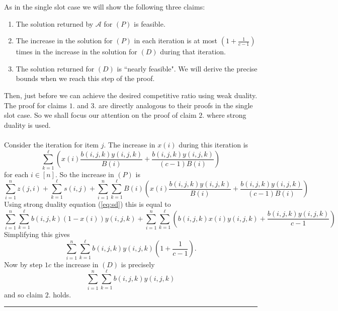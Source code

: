 \documentclass[letterpaper,12pt,oneside,onecolumn]{article}
\newcommand{\cA}{\mathcal{A}} \newcommand{\cB}{\mathcal{B}}
\newenvironment{proof}{{\bf Proof:  }}{\hfill\rule{2mm}{2mm}}
\begin{document}
\begin{proof}
As in the single slot case we will show the following three claims:
\begin{enumerate}
\item The solution returned by $\cA$ for $(P)$ is feasible.
\item The increase in the solution for $(P)$ in each iteration is at most $(1+\frac{1}{c-1})$ times in the increase in the solution for $(D)$ during that iteration.
\item The solution returned for $(D)$ is ``nearly feasible". We will derive the precise bounds when we reach this step of the proof. 
\end{enumerate}
Then, just before we can achieve the desired competitive ratio using weak duality.  The proof for claims $1.$ and $3.$ are directly analogous to their proofs in the single slot case. So we shall focus our attention on the proof of claim $2.$ where strong duality is used.
\paragraph{}
Consider the iteration for item $j$. The increase in $x(i)$ during this iteration is 
$$ \sum_{k=1}^\ell (x(i)\frac{b(i,j,k)y(i,j,k)}{B(i)} + \frac{b(i,j,k)y(i,j,k)}{(c-1)B(i)})$$
for each $i \in [n]$. So the increase in $(P)$ is
$$\sum_{i=1}^n z(j,i) + \sum_{k=1}^\ell s(i,j) +\sum_{i=1}^n\sum_{k=1}^\ell B(i) (x(i)\frac{b(i,j,k)y(i,j,k)}{B(i)} + \frac{b(i,j,k)y(i,j,k)}{(c-1)B(i)})$$
Using strong duality equation (\ref{eq:sd}) this is equal to
$$\sum_{i=1}^n \sum_{k=1}^\ell b(i,j,k)(1-x(i))y(i,j,k) + \sum_{i=1}^n \sum_{k=1}^\ell (b(i,j,k)x(i)y(i,j,k) + \frac{b(i,j,k)y(i,j,k)}{c-1}) $$
Simplifying this gives
$$\sum_{i=1}^n \sum_{k=1}^\ell b(i,j,k)y(i,j,k)(1+\frac{1}{c-1}).$$
Now by step $1c$ the increase in $(D)$ is precisely
$$\sum_{i=1}^n \sum_{k=1}^\ell b(i,j,k)y(i,j,k)$$
and so claim $2.$ holds.
\end{proof}


\end{document}
